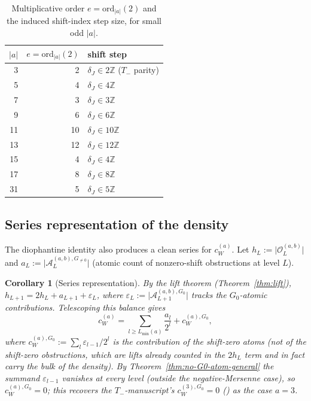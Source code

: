 \documentclass[11pt,reqno]{amsart}
\theoremstyle{plain}
\newtheorem{corollary}[theorem]{Corollary}
\theoremstyle{definition}
\theoremstyle{remark}
\newcommand{\Tneg}{T_{-}}
\newcommand{\Z}{\mathbb{Z}}
\newcommand{\Obs}{\mathcal{O}}
\newcommand{\Atom}{\mathcal{A}}
\newcommand{\ord}{\mathrm{ord}}
\newcommand{\cWa}{c_{W}^{(a)}}
\newcommand{\Obsab}{\Obs_{L}^{(a,b)}}
\begin{document}
\begin{table}[ht]
\centering
\begin{tabular}{rrl}
\toprule
$\lvert a \rvert$ & $e = \ord_{\lvert a\rvert}(2)$ & shift step \\
\midrule
3 & 2 & $\delta_J \in 2\Z$ ($\Tneg$ parity) \\
5 & 4 & $\delta_J \in 4\Z$ \\
7 & 3 & $\delta_J \in 3\Z$ \\
9 & 6 & $\delta_J \in 6\Z$ \\
11 & 10 & $\delta_J \in 10\Z$ \\
13 & 12 & $\delta_J \in 12\Z$ \\
15 & 4 & $\delta_J \in 4\Z$ \\
17 & 8 & $\delta_J \in 8\Z$ \\
31 & 5 & $\delta_J \in 5\Z$ \\
\bottomrule
\end{tabular}
\caption{Multiplicative order $e = \ord_{\lvert a\rvert}(2)$ and the
induced shift-index step size, for small odd $\lvert a \rvert$.}
\label{tab:order}
\end{table}

\subsection{Series representation of the density}

The diophantine identity also produces a clean series for $\cWa$. Let
$h_L := \lvert \Obsab \rvert$ and $a_L := \lvert \Atom_L^{(a,b),
G_{\ne 0}} \rvert$ (atomic count of nonzero-shift obstructions at level
$L$).

\begin{corollary}[Series representation]\label{cor:series}
By the lift theorem (Theorem~\ref{thm:lift}), $h_{L+1} = 2 h_L +
a_{L+1} + \varepsilon_L$, where $\varepsilon_L := \lvert \Atom_{L+1}^{(a,b),
G_0} \rvert$ tracks the $G_0$-atomic contributions. Telescoping this
balance gives
\[
\cWa = \sum_{l \ge L_{\min}(a)} \frac{a_l}{2^l} + c_W^{(a), G_0},
\]
where $c_W^{(a), G_0} := \sum_l \varepsilon_{l-1}/2^l$ is the contribution
of the shift-zero \emph{atoms} (not of the shift-zero obstructions, which
are lifts already counted in the $2 h_L$ term and in fact carry the bulk
of the density). By Theorem~\ref{thm:no-G0-atom-general} the summand
$\varepsilon_{l-1}$ vanishes at every level (outside the negative-Mersenne
case), so $c_W^{(a), G_0} = 0$; this recovers the $\Tneg$-manuscript's
$c_W^{(3), G_0} = 0$
(\cite[Theorem~6.2]{ObstructionResidues2026}) as the case $a = 3$.
\end{corollary}
\end{document}
